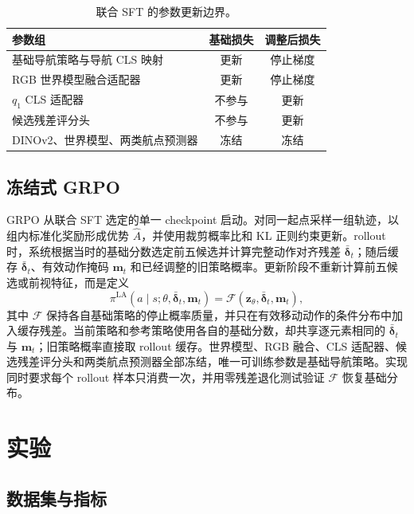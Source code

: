 \documentclass[UTF8,11pt]{ctexart}
\begin{document}
\begin{table}[t]
\centering
\caption{联合 SFT 的参数更新边界。}
\label{tab:gradients}
\begin{tabularx}{\linewidth}{Ycc}
\toprule
参数组 & 基础损失 & 调整后损失 \\
\midrule
基础导航策略与导航 CLS 映射 & 更新 & 停止梯度 \\
RGB 世界模型融合适配器 & 更新 & 停止梯度 \\
$q_1$ CLS 适配器 & 不参与 & 更新 \\
候选残差评分头 & 不参与 & 更新 \\
DINOv2、世界模型、两类航点预测器 & 冻结 & 冻结 \\
\bottomrule
\end{tabularx}
\end{table}

\subsection{冻结式 GRPO}

GRPO 从联合 SFT 选定的单一 checkpoint 启动。对同一起点采样一组轨迹，以组内标准化奖励形成优势 $\hat{A}$，并使用裁剪概率比和 KL 正则约束更新\cite{shao2024deepseekmath,schulman2017ppo}。rollout 时，系统根据当时的基础分数选定前五候选并计算完整动作对齐残差 $\bar{\boldsymbol\delta}_t$；随后缓存 $\bar{\boldsymbol\delta}_t$、有效动作掩码 $\mathbf m_t$ 和已经调整的旧策略概率。更新阶段不重新计算前五候选或前视特征，而是定义
\begin{equation}
\pi^{\mathrm{LA}}(a\mid s;\theta,\bar{\boldsymbol\delta}_t,\mathbf m_t)
=\mathcal{F}(\mathbf z_{\theta},\bar{\boldsymbol\delta}_t,\mathbf m_t),
\end{equation}
其中 $\mathcal{F}$ 保持各自基础策略的停止概率质量，并只在有效移动动作的条件分布中加入缓存残差。当前策略和参考策略使用各自的基础分数，却共享逐元素相同的 $\bar{\boldsymbol\delta}_t$ 与 $\mathbf m_t$；旧策略概率直接取 rollout 缓存。世界模型、RGB 融合、CLS 适配器、候选残差评分头和两类航点预测器全部冻结，唯一可训练参数是基础导航策略。实现同时要求每个 rollout 样本只消费一次，并用零残差退化测试验证 $\mathcal{F}$ 恢复基础分布。

\section{实验}

\subsection{数据集与指标}
\end{document}
